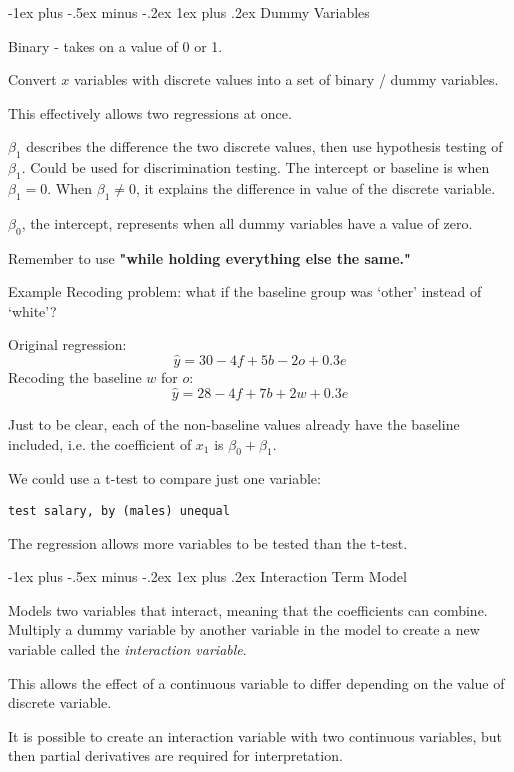 \documentclass[10pt,landscape]{article}
\makeatletter
\renewcommand{\subsubsection}{\@startsection{subsubsection}{3}{0mm}%
                                {-1ex plus -.5ex minus -.2ex}%
                                {1ex plus .2ex}%
                                {\normalfont\small\bfseries}}
\makeatother
\begin{document}
\begin{multicols*}{3}
\subsubsection{Dummy Variables}

Binary - takes on a value of 0 or 1.

Convert $x$ variables with discrete values into a set of binary / dummy variables.

This effectively allows two regressions at once.

$\beta_1$ describes the difference the two discrete values, then use hypothesis testing of $\beta_1$. Could be used for discrimination testing. The intercept or baseline is when $\beta_1 = 0$. When $\beta_1 \neq 0$, it explains the difference in value of the discrete variable.

$\beta_0$, the intercept, represents when all dummy variables have a value of zero.

Remember to use \textbf{"while holding everything else the same."}

Example Recoding problem: what if the baseline group was `other' instead of `white'? 

Original regression:
\[
\hat{y} = 30 -4 f + 5 b - 2 o + 0.3 e
\]
Recoding the baseline $w$ for $o$:
\[
\hat{y} = 28 -4 f + 7 b + 2 w + 0.3 e
\]

Just to be clear, each of the non-baseline values already have the baseline included, i.e. the coefficient of $x_1$ is $\beta_0 + \beta_1$.

We could use a t-test to compare just one variable:
\begin{verbatim}
test salary, by (males) unequal
\end{verbatim}

The regression allows more variables to be tested than the t-test.

\subsubsection{Interaction Term Model}

Models two variables that interact, meaning that the coefficients can combine. Multiply a dummy variable by another variable in the model to create a new variable called the \textit{interaction variable}.

This allows the effect of a continuous variable to differ depending on the value of discrete variable.

It is possible to create an interaction variable with two continuous variables, but then partial derivatives are required for interpretation.


\end{multicols*}
\end{document}
